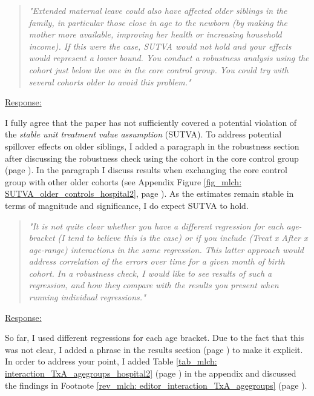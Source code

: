 \bigskip
\begin{quote}
	\textit{"Extended maternal leave could also have affected older siblings in the family, in particular those close in age to the newborn (by making the mother more available, improving her health or increasing household income). If this were the case, SUTVA would not hold and your effects would represent a lower bound. You conduct a robustness analysis using the cohort just below the one in the core control group. You could try with several cohorts older to avoid this problem."}
\end{quote}
\underline{Response:}


I fully agree that the paper has not sufficiently covered a potential violation of the \textit{stable unit treatment value assumption} (SUTVA). To address potential spillover effects on older siblings, I added a paragraph in the robustness section after discussing the robustness check using the cohort in the core control group (page \pageref{rev_mlch: editor_SUTVA_older_cohorts}). In the paragraph I discuss results when exchanging the core control group with other older cohorts (see Appendix Figure \ref{fig_mlch: SUTVA_older_controls_hospital2}, page \pageref{fig_mlch: SUTVA_older_controls_hospital2}). As the estimates remain stable in terms of magnitude and significance, I do expect SUTVA to hold.



\bigskip
\begin{quote}
	\textit{"It is not quite clear whether you have a different regression for each age-bracket (I tend to believe this is the case) or if you include (Treat x After x age-range) interactions in the same regression. This latter approach would address correlation of the errors over time for a given month of birth cohort. In a robustness check, I would like to see results of such a regression, and how they compare with the results you present when running individual regressions."}
\end{quote}
\underline{Response:}


So far, I used different regressions for each age bracket. Due to the fact that this was not clear, I added a phrase in the results section (page \pageref{rev_mlch: editor_comprehension_interaction}) to make it explicit. In order to address your point, I added Table \ref{tab_mlch: interaction_TxA_agegroups_hospital2} (page \pageref{tab_mlch: interaction_TxA_agegroups_hospital2}) in the appendix and discussed the findings in Footnote \ref{rev_mlch: editor_interaction_TxA_agegroups} (page \pageref{rev_mlch: editor_interaction_TxA_agegroups}).

